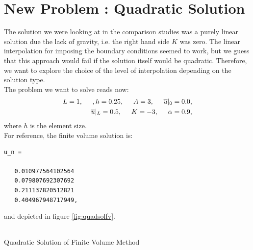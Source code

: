 \documentclass[a4paper,12pt]{article}
\makeatletter
\newenvironment{figurehere}
  {\def\@captype{figure}}
  {}
\makeatother
\begin{document}
\section{New Problem : Quadratic Solution}
The solution we were looking at in the comparison studies was a purely linear solution due the lack of gravity, i.e. the right hand side $K$ was zero. The linear interpolation for imposing the boundary conditions seemed to work, but we guess that this approach would fail if the solution itself would be quadratic. Therefore, we want to explore the choice of the level of interpolation depending on the solution type. \\
The problem we want to solve reads now: 
\begin{eqnarray}
L = 1, \hspace{0.5cm}, h = 0.25, \hspace{0.5cm}A= 3, \hspace{0.5cm}\overline{u}\vert_0 = 0.0,\\ 
\overline{u}\vert_L=0.5, \hspace{0.5cm}K = -3,\hspace{0.5cm}\alpha = 0.9,
\end{eqnarray}
where $h$ is the element size.\\
For reference, the finite volume solution is:
\begin{verbatim}
u_n =

   0.010977564102564
   0.079807692307692
   0.211137820512821
   0.404967948717949,
\end{verbatim}
and depicted in figure \ref{fig:quadsolfv}.\\
\begin{center}
\begin{figurehere}
\\
\caption{Quadratic Solution of Finite Volume Method}\label{fig:quadsolfv}
\end{figurehere}
\end{center}
\end{document}
